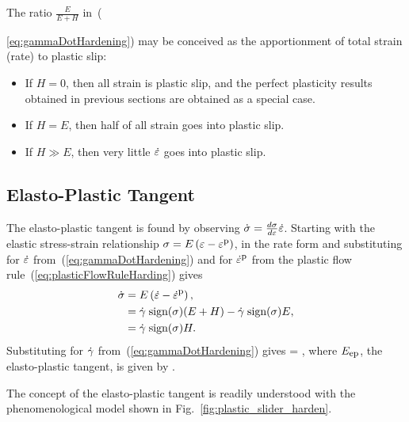 The ratio $\frac{E}{E + H}$ in~({\ref{eq:gammaDotHardening}) 
may be conceived as the apportionment of
total strain (rate) to plastic slip:
\begin{itemize}
 \item If $H = 0$, then all strain is plastic slip, 
 and the perfect plasticity results obtained in previous sections 
 are obtained as a special case.
 \item If $H=E$, then half of all strain goes into plastic slip.
 \item If $H \gg E$, then very little $\dot{\varepsilon}$ goes into plastic slip.
\end{itemize}

\subsection{Elasto-Plastic Tangent}
The elasto-plastic tangent is found by 
observing $\dot{\sigma} = \frac{d\sigma}{d\varepsilon} \dot{\varepsilon}$.  
Starting with the elastic stress-strain relationship
$\sigma = E \left(\varepsilon - \varepsilon^{\mbox{\footnotesize p}}\right)$,
in the rate form and 
substituting for $\dot{\varepsilon}$ from~(\ref{eq:gammaDotHardening})
and for $\dot{\varepsilon}^{\mbox{\footnotesize p}}$ from the plastic flow 
rule~(\ref{eq:plasticFlowRuleHarding}) 
gives
\begin{align}
 \dot{\sigma} 
 & = E \left( \dot{\varepsilon} - \dot{\varepsilon}^{\mbox{\footnotesize p}} \right), \nonumber \\
 & = \dot{\gamma} \; \mbox{sign}(\sigma) (E + H) - \dot{\gamma} \; \mbox{sign}(\sigma) E, \nonumber \\ 
 & = \dot{\gamma} \; \mbox{sign}(\sigma) H.
\end{align}
Substituting for $\dot{\gamma}$ from~(\ref{eq:gammaDotHardening}) gives
\be
 \sigmadot = \dst{} \hstraindot, 
\ee
where $E_{\mbox{\footnotesize ep}}$, the elasto-plastic tangent, is given by
\be
 .
\ee
		      
The concept of the elasto-plastic tangent is readily understood with 
the phenomenological model
shown in Fig.~\ref{fig:plastic_slider_harden}.



}
